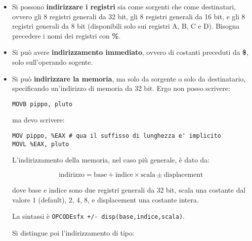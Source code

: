 \documentclass[a4paper,11pt]{article}
\begin{document}
\begin{itemize}
	\item 
Si possono \textbf{indirizzare i registri} sia come sorgenti che come destinatari, ovvero gli 8 registri generali da 32 bit, gli 8 registri generali da 16 bit, e gli 8 registri generali da 8 bit (disponibili solo sui registri A, B, C e D).
Bisogna precedere i nomi dei registri con \textbf{\%}.
	\item
Si può avere \textbf{indirizzamento immediato}, ovvero di costanti preceduti da \textbf{\$}, solo sull'operando sogente.
	\item
		Si può \textbf{indirizzare la memoria}, ma solo da sorgente o solo da destinatario, specificando un'indirizzo di memoria da 32 bit.
Ergo non posso scrivere:

\begin{lstlisting}[style=codestyle]	
MOVB pippo, pluto
\end{lstlisting}

ma devo scrivere:

\begin{lstlisting}[style=codestyle]	
MOV pippo, %EAX	# qua il suffisso di lunghezza e' implicito
MOVL %EAX, pluto
\end{lstlisting}

L'indirizzamento della memoria, nel caso più generale, è dato da: 

$$ \text{indirizzo} = \text{base} + \text{indice} \times \text{scala} \pm \text{displacement} $$

dove base e indice sono due registri generali da 32 bit, scala una costante dal valore 1 (default), 2, 4, 8, e displacement una costante intera.

La sintassi è \lstinline|OPCODEsfx +/- disp(base,indice,scala)|.

Si distingue poi l'indirizzamento di tipo:


\end{itemize}
\end{document}
